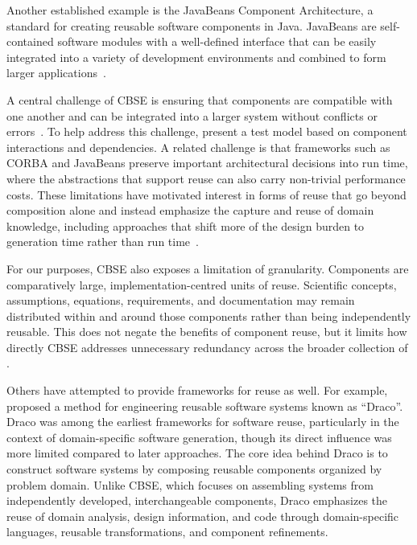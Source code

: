 Another established example is the JavaBeans Component Architecture, a
standard for creating reusable software components in Java. JavaBeans are 
self-contained software modules with a well-defined interface that can be 
easily integrated into a variety of development environments and combined to 
form larger applications~\citep{OracleJavaBeans}.

A central challenge of CBSE is ensuring that components are compatible with one
another and can be integrated into a larger system without conflicts or
errors~\citep{BassEtAl2000}. To help address this challenge, \citet{Wu2001}
present a test model based on component interactions and dependencies. A
related challenge is
that frameworks such as CORBA and JavaBeans preserve important architectural
decisions into run time, where the abstractions that support reuse can also
carry non-trivial performance costs. These limitations have motivated interest
in forms of reuse that go beyond composition alone and instead emphasize the
capture and reuse of domain knowledge, including approaches that shift more of
the design burden to generation time rather than run
time~\citep{Czarnecki2000}.

For our purposes, CBSE also exposes a limitation of granularity. Components are
comparatively large, implementation-centred units of reuse. Scientific
concepts, assumptions, equations, requirements, and documentation may remain
distributed within and around those components rather than being independently
reusable. This does not negate the benefits of component reuse, but it limits
how directly CBSE addresses unnecessary redundancy across the broader
collection of \sfs{}.

Others have attempted to provide frameworks for reuse as well. For example,
\citet{Neighbors1980,Neighbors1984,Neighbors1989} proposed a method
for engineering reusable software systems known as ``Draco''. Draco was among
the earliest frameworks for software reuse, particularly in the context of
domain-specific software generation, though its direct influence was more
limited compared to later approaches. The core idea behind Draco is to
construct software systems by composing reusable components organized by
problem domain. Unlike CBSE, which focuses on assembling systems from
independently developed, interchangeable components, Draco emphasizes the reuse
of domain analysis, design information, and code through domain-specific
languages, reusable transformations, and component refinements.

